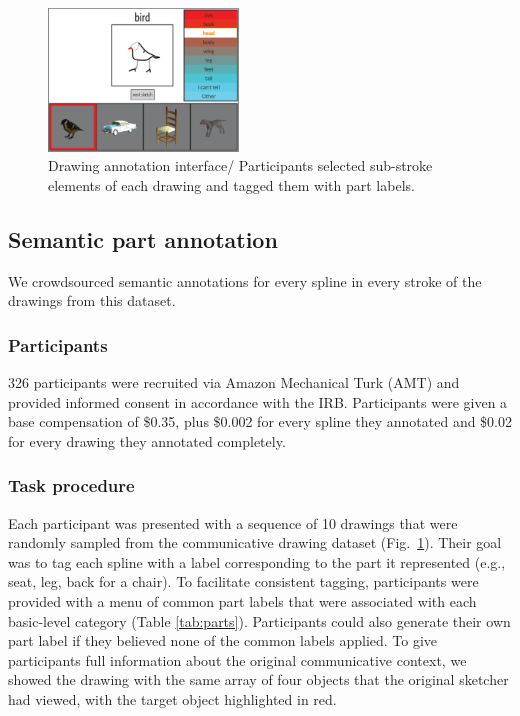 \documentclass[10pt,letterpaper]{article}
\begin{document}
\begin{figure}[htbp]
\centering
\includegraphics[width=0.45\textwidth]{figures/4_annotation_interface.pdf}
\caption{Drawing annotation interface/ Participants selected sub-stroke elements of each drawing and tagged them with part labels.} %
\label{annotation_interface}
\vspace{-1em}
\end{figure}

\subsection{Semantic part annotation}

We crowdsourced semantic annotations for every spline in every stroke of the drawings from this dataset. 

\subsubsection{Participants}
326 participants were recruited via Amazon Mechanical Turk (AMT) and provided informed consent in accordance with the  IRB.  %
Participants were given a base compensation of \$0.35, plus \$0.002 for every spline they annotated and \$0.02 for every drawing they annotated completely. 

\subsubsection{Task procedure}
Each participant was presented with a sequence of 10 drawings that were randomly sampled from the communicative drawing dataset (Fig.~\ref{annotation_interface}). 
Their goal was to tag each spline with a label corresponding to the part it represented (e.g., seat, leg, back for a chair).  
To facilitate consistent tagging, participants were provided with a menu of common part labels that were associated with each basic-level category (Table \ref{tab:parts}).
Participants could also generate their own part label if they believed none of the common labels applied.
To give participants full information about the original communicative context, we showed the drawing with the same array of four objects that the original sketcher had viewed, with the target object highlighted in red. 
\end{document}
